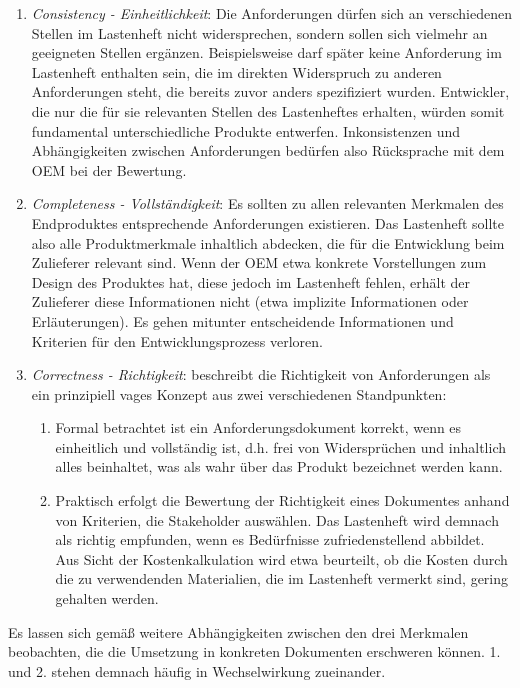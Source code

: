 \documentclass[12pt]{report}
\begin{document}
\begin{enumerate}
\item \textit{Consistency - Einheitlichkeit}: Die Anforderungen dürfen sich an verschiedenen Stellen im Lastenheft nicht widersprechen, sondern sollen sich vielmehr an geeigneten Stellen ergänzen. Beispielsweise darf später keine Anforderung im Lastenheft enthalten sein, die im direkten Widerspruch zu anderen Anforderungen steht, die bereits zuvor anders spezifiziert wurden. Entwickler, die nur die für sie relevanten Stellen des Lastenheftes erhalten, würden somit fundamental unterschiedliche Produkte entwerfen. Inkonsistenzen und Abhängigkeiten zwischen Anforderungen bedürfen also Rücksprache mit dem OEM bei der Bewertung.
\item \textit{Completeness - Vollständigkeit}: Es sollten zu allen relevanten Merkmalen des Endproduktes entsprechende Anforderungen existieren. Das Lastenheft sollte also alle Produktmerkmale inhaltlich abdecken, die für die Entwicklung beim Zulieferer relevant sind. Wenn der OEM etwa konkrete Vorstellungen zum Design des Produktes hat, diese jedoch im Lastenheft fehlen, erhält der Zulieferer diese Informationen nicht (etwa implizite Informationen oder Erläuterungen). Es gehen mitunter entscheidende Informationen und Kriterien für den Entwicklungsprozess verloren.
\item \textit{Correctness - Richtigkeit}: \cite{zg02} beschreibt die Richtigkeit von Anforderungen als ein prinzipiell vages Konzept aus zwei verschiedenen Standpunkten:
\begin{enumerate}
\item Formal betrachtet ist ein Anforderungsdokument korrekt, wenn es einheitlich und vollständig ist, d.h. frei von Widersprüchen und inhaltlich alles beinhaltet, was als \glqq wahr\grqq{} über das Produkt bezeichnet werden kann.
\item Praktisch erfolgt die Bewertung der Richtigkeit eines Dokumentes anhand von Kriterien, die Stakeholder auswählen. Das Lastenheft wird demnach als richtig empfunden, wenn es Bedürfnisse zufriedenstellend abbildet. Aus Sicht der Kostenkalkulation wird etwa beurteilt, ob die Kosten durch die zu verwendenden Materialien, die im Lastenheft vermerkt sind, gering gehalten werden.
\end{enumerate}
\end{enumerate}

Es lassen sich gemäß \cite{zg02} weitere Abhängigkeiten zwischen den drei Merkmalen beobachten, die die Umsetzung in konkreten Dokumenten erschweren können. 1. und 2. stehen demnach häufig in Wechselwirkung zueinander. 
\end{document}
